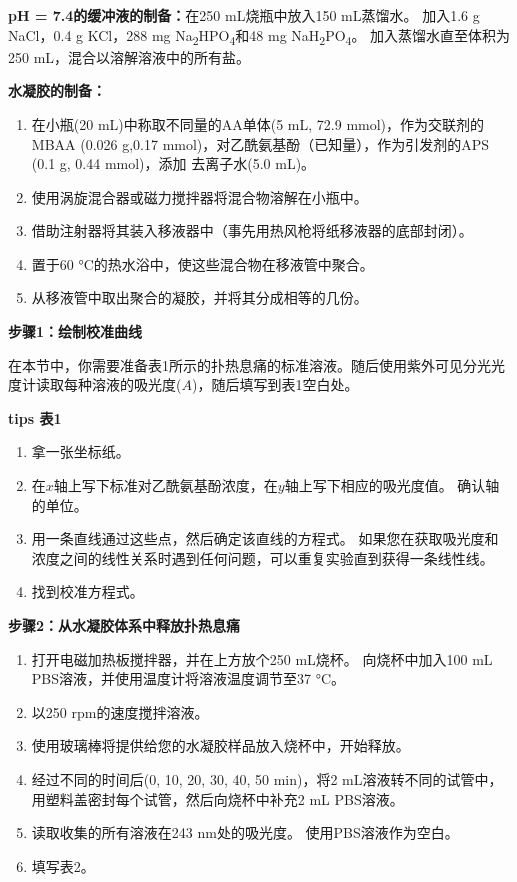 \textbf{pH = 7.4的缓冲液的制备：}在250 mL烧瓶中放入150 mL蒸馏水。
加入1.6 g NaCl，0.4 g KCl，288 mg
Na\textsubscript{2}HPO\textsubscript{4}和48 mg
NaH\textsubscript{2}PO\textsubscript{4}。 加入蒸馏水直至体积为250
mL，混合以溶解溶液中的所有盐。

\textbf{水凝胶的制备：}

\begin{enumerate}
\tightlist
\item 在小瓶(20 mL)中称取不同量的AA单体(5 mL, 72.9 mmol)，作为交联剂的MBAA
  (0.026 g,0.17 mmol)，对乙酰氨基酚（已知量），作为引发剂的APS (0.1 g,
  0.44 mmol)，添加 去离子水(5.0 mL)。
\item 使用涡旋混合器或磁力搅拌器将混合物溶解在小瓶中。
\item 借助注射器将其装入移液器中（事先用热风枪将纸移液器的底部封闭）。
\item 置于60 °C的热水浴中，使这些混合物在移液管中聚合。
\item 从移液管中取出聚合的凝胶，并将其分成相等的几份。
\end{enumerate}

\noindent\textbf{步骤1：绘制校准曲线}

在本节中，你需要准备表1所示的扑热息痛的标准溶液。随后使用紫外可见分光光度计读取每种溶液的吸光度(\(A\))，随后填写到表1空白处。

\textbf{tips 表1}

\begin{enumerate}
\tightlist
\item
  拿一张坐标纸。
\item
  在\(x\)轴上写下标准对乙酰氨基酚浓度，在\(y\)轴上写下相应的吸光度值。
  确认轴的单位。
\item
  用一条直线通过这些点，然后确定该直线的方程式。
  如果您在获取吸光度和浓度之间的线性关系时遇到任何问题，可以重复实验直到获得一条线性线。
\item
  找到校准方程式。
\end{enumerate}

\noindent\textbf{步骤2：从水凝胶体系中释放扑热息痛}

\begin{enumerate}
\tightlist
\item
  打开电磁加热板搅拌器，并在上方放个250 mL烧杯。 向烧杯中加入100 mL
  PBS溶液，并使用温度计将溶液温度调节至37 °C。
\item
  以250 rpm的速度搅拌溶液。
\item
  使用玻璃棒将提供给您的水凝胶样品放入烧杯中，开始释放。
\item
  经过不同的时间后(0, 10, 20, 30, 40, 50 min)，将2
  mL溶液转不同的试管中，用塑料盖密封每个试管，然后向烧杯中补充2 mL
  PBS溶液。
\item
  读取收集的所有溶液在243 nm处的吸光度。 使用PBS溶液作为空白。
\item
  填写表2。
\end{enumerate}


